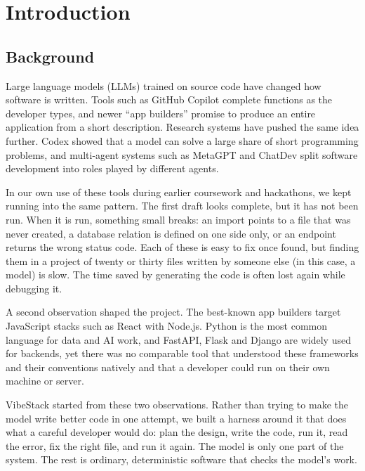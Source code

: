 \documentclass[12pt,a4paper]{report}
\begin{document}
\newpage
\tableofcontents

\newpage
\listoffigures
{}

\newpage
\listoftables
{}

\newpage
{}
\doublespacing

\chapter{Introduction}
\section{Background}

Large language models (LLMs) trained on source code have changed how software is written. Tools such as GitHub Copilot \cite{copilot} complete functions as the developer types, and newer ``app builders'' promise to produce an entire application from a short description. Research systems have pushed the same idea further. Codex \cite{chen2021codex} showed that a model can solve a large share of short programming problems, and multi-agent systems such as MetaGPT \cite{hong2024metagpt} and ChatDev \cite{qian2024chatdev} split software development into roles played by different agents.

In our own use of these tools during earlier coursework and hackathons, we kept running into the same pattern. The first draft looks complete, but it has not been run. When it is run, something small breaks: an import points to a file that was never created, a database relation is defined on one side only, or an endpoint returns the wrong status code. Each of these is easy to fix once found, but finding them in a project of twenty or thirty files written by someone else (in this case, a model) is slow. The time saved by generating the code is often lost again while debugging it.

A second observation shaped the project. The best-known app builders target JavaScript stacks such as React with Node.js. Python is the most common language for data and AI work, and FastAPI, Flask and Django are widely used for backends, yet there was no comparable tool that understood these frameworks and their conventions natively and that a developer could run on their own machine or server.

VibeStack started from these two observations. Rather than trying to make the model write better code in one attempt, we built a harness around it that does what a careful developer would do: plan the design, write the code, run it, read the error, fix the right file, and run it again. The model is only one part of the system. The rest is ordinary, deterministic software that checks the model's work.
\end{document}
